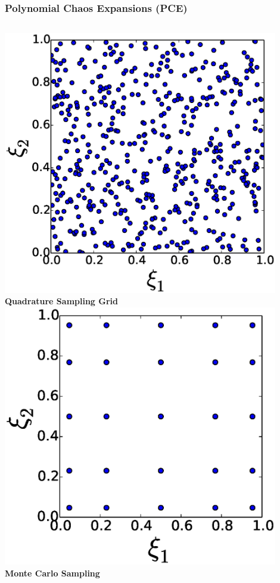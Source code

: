 \documentclass[9pt]{beamer}
\begin{document}
\begin{frame}
\frametitle{Polynomial Chaos Expansions (PCE)}
\label{sec-2-4}

\begin{columns}[c]
    \centering
    \includegraphics[width=0.9\textwidth]{MonteCarlo} \\
    \bf{Quadrature Sampling Grid}
    \centering
    \includegraphics[width=0.9\textwidth]{QuadraturePoints} \\
    {\bf Monte Carlo Sampling}
\end{columns}
\end{frame}
\end{document}
